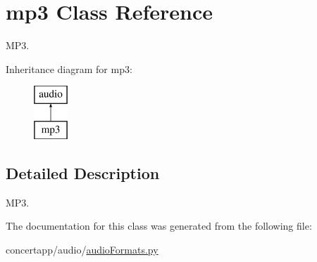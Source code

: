 \hypertarget{classmp3}{
\section{mp3 Class Reference}
\label{classmp3}
}


MP3.  


Inheritance diagram for mp3:\begin{figure}[H]
\begin{center}
\leavevmode
\includegraphics[height=2.000000cm]{classmp3}
\end{center}
\end{figure}


\subsection{Detailed Description}
MP3. 

The documentation for this class was generated from the following file:\begin{DoxyCompactItemize}
\item 
concertapp/audio/\hyperlink{audio_formats_8py}{audioFormats.py}\end{DoxyCompactItemize}
